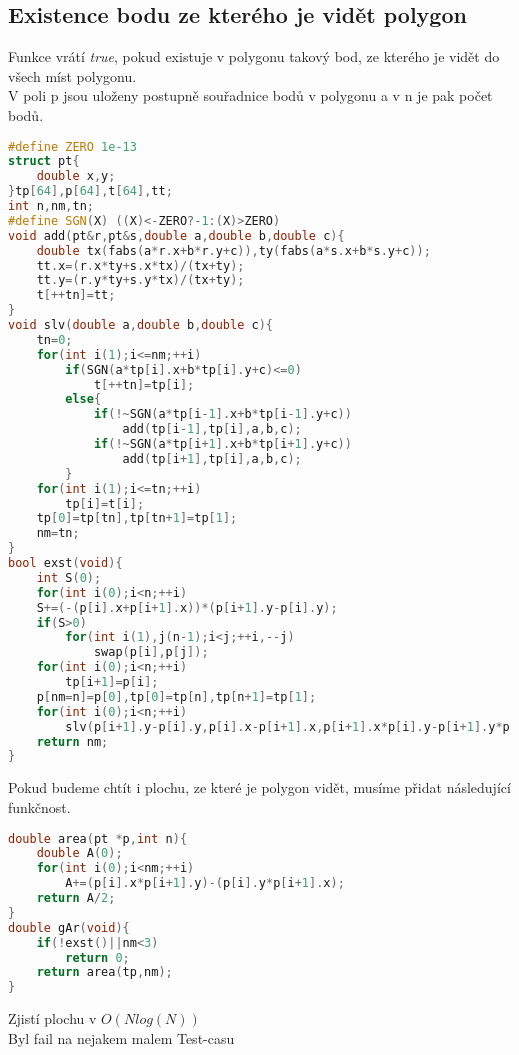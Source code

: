 \documentclass[11pt]{article}
\begin{document}
\subsection{Existence bodu ze kterého je vidět polygon}
Funkce vrátí \textit{true}, pokud existuje v polygonu takový bod, ze kterého je vidět do všech míst polygonu.
\\V poli \textsf{p} jsou uloženy postupně souřadnice bodů v polygonu a v \textsf{n} je pak počet bodů.
\begin{lstlisting}[language=C++]
#define ZERO 1e-13
struct pt{
    double x,y;
}tp[64],p[64],t[64],tt;
int n,nm,tn;
#define SGN(X) ((X)<-ZERO?-1:(X)>ZERO)
void add(pt&r,pt&s,double a,double b,double c){
    double tx(fabs(a*r.x+b*r.y+c)),ty(fabs(a*s.x+b*s.y+c));
    tt.x=(r.x*ty+s.x*tx)/(tx+ty);
    tt.y=(r.y*ty+s.y*tx)/(tx+ty);
    t[++tn]=tt;
}
void slv(double a,double b,double c){
    tn=0;
    for(int i(1);i<=nm;++i)
        if(SGN(a*tp[i].x+b*tp[i].y+c)<=0)
            t[++tn]=tp[i];
        else{
            if(!~SGN(a*tp[i-1].x+b*tp[i-1].y+c))
                add(tp[i-1],tp[i],a,b,c);
            if(!~SGN(a*tp[i+1].x+b*tp[i+1].y+c))
                add(tp[i+1],tp[i],a,b,c);
        }
    for(int i(1);i<=tn;++i)
        tp[i]=t[i];
    tp[0]=tp[tn],tp[tn+1]=tp[1];
    nm=tn;
}
bool exst(void){
    int S(0);
    for(int i(0);i<n;++i)	
	S+=(-(p[i].x+p[i+1].x))*(p[i+1].y-p[i].y);
    if(S>0)
        for(int i(1),j(n-1);i<j;++i,--j)
            swap(p[i],p[j]);
    for(int i(0);i<n;++i)
        tp[i+1]=p[i];
    p[nm=n]=p[0],tp[0]=tp[n],tp[n+1]=tp[1];
    for(int i(0);i<n;++i)
        slv(p[i+1].y-p[i].y,p[i].x-p[i+1].x,p[i+1].x*p[i].y-p[i+1].y*p[i].x);
    return nm;
}
\end{lstlisting}
Pokud budeme chtít i plochu, ze které je polygon vidět, musíme přidat následující funkčnost.
\begin{lstlisting}[language=C++]
double area(pt *p,int n){
    double A(0);
    for(int i(0);i<nm;++i)
        A+=(p[i].x*p[i+1].y)-(p[i].y*p[i+1].x);
    return A/2;
}
double gAr(void){
    if(!exst()||nm<3)
        return 0;
    return area(tp,nm);
}
\end{lstlisting}
Zjistí plochu v $O(Nlog(N))$
\\Byl fail na nejakem malem Test-casu
\end{document}
